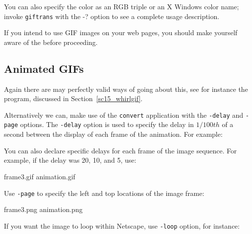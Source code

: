 \documentclass[twoside,11pt]{starlink}
\begin{document}
\begin{terminalv}
\end{terminalv}

You can also specify the color as an RGB triple or an X Windows color
name; invoke \texttt{giftrans} with the -? option to see a complete usage
description.

If you intend to use GIF images on your web pages, you should make
yourself aware of the  before
proceeding.

\subsection{Animated GIFs\label{sc15_animated}}

Again there are may perfectly valid ways of going about this, see for
instance the  program,
discussed in Section~\ref{sc15_whirlgif}.

Alternatively we can, make use of the
 \texttt{convert} application with the
\texttt{-delay} and \texttt{-page} options. The \texttt{-delay} option is used
to specify the delay in $1/100 th$ of a second between the display of
each frame of the animation. For example:

\begin{terminalv}
\end{terminalv}

You can also declare specific delays for each frame of the image
sequence. For example, if the delay was 20, 10, and 5, use:

\begin{terminalv}
  frame3.gif animation.gif
\end{terminalv}

Use \texttt{-page} to specify the left and top locations of the image frame:

\begin{terminalv}
  frame3.png animation.png
\end{terminalv}

If you want the image to loop within Netscape, use \texttt{-loop} option, for instance:

\begin{terminalv}
\end{terminalv}
\end{document}
